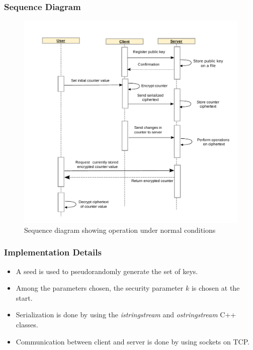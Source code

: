 \documentclass{beamer}
\begin{document}
\begin{frame}
\frametitle{Sequence Diagram}

\begin{figure}[H]
  \centering
  \includegraphics[scale=0.35]{../img/counter}
  \caption{Sequence diagram showing operation under normal conditions}
  \label{fig:seqdiag}
\end{figure}
\end{frame}

\begin{frame}
\frametitle{Implementation Details}
\begin{itemize}
\item A seed is used to pseudorandomly generate the set of keys.
\item Among the parameters chosen, the security parameter $k$ is chosen at the start.
\item Serialization is done by using the \emph{istringstream} and \emph{ostringstream} C++ classes.
\item Communication between client and server is done by using sockets on TCP.
\end{itemize}
\end{frame}

\end{document}
